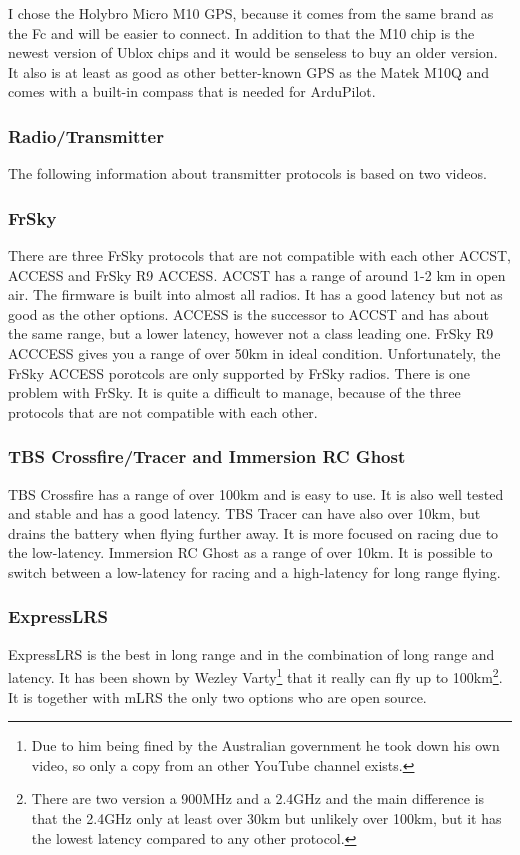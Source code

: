 \documentclass{article}
\begin{document}
	I chose the Holybro Micro M10 GPS\cite{holybrom10micro}, because it comes from the same brand as the Fc and will be easier to connect. In addition to that the M10 chip is the newest version of Ublox chips and it would be senseless to buy an older version. It also is at least as good as other better-known GPS as the Matek M10Q\cite{gpstest} and comes with a built-in compass that is needed for ArduPilot.

	\subsubsection{Radio/Transmitter}
	The following information about transmitter protocols is based on two videos\cite{transprotocols}\cite{mlrs}.
	\subsubsection*{FrSky}
	There are three FrSky protocols that are not compatible with each other ACCST, ACCESS and FrSky R9 ACCESS. ACCST has a range of around 1-2 km in open air. The firmware is built into almost all radios. It has a good latency but not as good as the other options. ACCESS is the successor to ACCST and has about the same range, but a lower latency, however not a class leading one. FrSky R9 ACCCESS gives you a range of over 50km in ideal condition. Unfortunately, the FrSky ACCESS porotcols are only supported by FrSky radios. There is one problem with FrSky. It is quite a difficult to manage, because of the three protocols that are not compatible with each other.

	\subsubsection*{TBS Crossfire/Tracer and Immersion RC Ghost}
	TBS Crossfire has a range of over 100km and is easy to use. It is also well tested and stable and has a good latency. 
	TBS Tracer can have also over 10km, but drains the battery when flying further away. It is more focused on racing due to the low-latency.
	Immersion RC Ghost as a range of over 10km. It is possible to switch between a low-latency for racing and a high-latency for long range flying. 
	\subsubsection*{ExpressLRS}
	ExpressLRS is the best in long range and in the combination of long range and latency. It has been shown by Wezley Varty\cite{elrswezley}\footnote{Due to him being fined by the Australian government he took down his own video, so only a copy from an other YouTube channel exists.} that it really can fly up to 100km\footnote{There are two version a 900MHz and a 2.4GHz and the main difference is that the 2.4GHz only at least over 30km but unlikely over 100km, but it has the lowest latency compared to any other protocol.}. It is together with mLRS the only two options who are open source.
\end{document}

